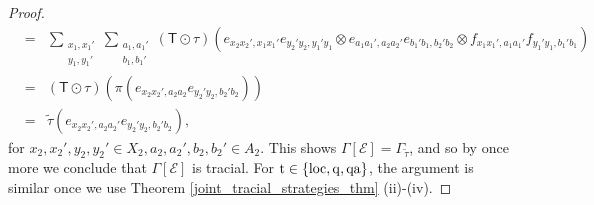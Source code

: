 \documentclass[11pt]{amsart}
\newcommand{\cl}[1]{\mathcal{#1}}
\begin{document}
\begin{proof}
\begin{eqnarray*}
& = &
\sum\limits_{\substack{x_{1}, x_{1}' \\ y_{1}, y_{1}'}}\sum\limits_{\substack{a_{1}, a_{1}' \\ b_{1}, b_{1}'}}(\mathsf{T}\odot \tau)(e_{x_{2}x_{2}', x_{1}x_{1}'}e_{y_{2}'y_{2}, y_{1}'y_{1}}\otimes e_{a_{1}a_{1}', a_{2}a_{2}'}e_{b_{1}'b_{1}, b_{2}'b_{2}}\otimes f_{x_{1}x_{1}', a_{1}a_{1}'}f_{y_{1}'y_{1}, b_{1}'b_{1}}) \\
& = &
(\mathsf{T}\odot \tau)(\pi(e_{x_{2}x_{2}', a_{2}a_{2}}e_{y_{2}'y_{2}, b_{2}'b_{2}})) \\
& = &
\tilde{\tau}(e_{x_{2}x_{2}', a_{2}a_{2}'}e_{y_{2}'y_{2}, b_{2}'b_{2}}),
\end{eqnarray*}
\noindent for $x_{2}, x_{2}', y_{2}, y_{2}' \in X_{2}, a_{2}, a_{2}', b_{2}, b_{2}' \in A_{2}$. This shows $\Gamma[\cl{E}] = \Gamma_{\tilde{\tau}}$, and so by \cite[Theorem 4.10]{synch_bhtt} once more we conclude that $\Gamma[\cl{E}]$ is tracial. For ${\rm t} \in \{\rm loc, q, qa\}$, the argument is similar once we use Theorem \ref{joint_tracial_strategies_thm} (ii)-(iv). 
\end{proof}

\end{document}

